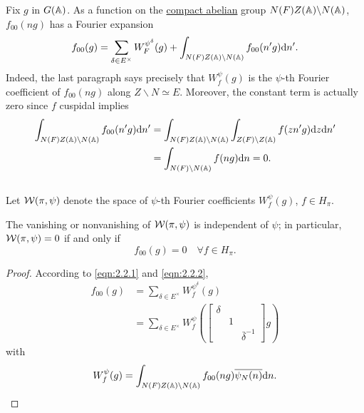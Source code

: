 Fix $g$ in $G(\mathbb{A})$.
As a function on the \underline{compact abelian} group $N(F) Z(\mathbb{A}) \backslash N(\mathbb{A})$, $f_{00}(ng)$ has a Fourier expansion
\begin{equation}
    \label{eqn:2.2.2}
    f_{00}(g) = \sum_{\delta \in E^\times} W_{F}^{\psi^\delta}(g) + \int_{N(F) Z(\mathbb{A}) \backslash N(\mathbb{A})} f_{00}(n'g) \mathrm{d} n'.
\end{equation}
Indeed, the last paragraph says precisely that $W_f^\psi(g)$ is the $\psi$-th Fourier coefficient of $f_{00}(ng)$ along $Z \backslash N \simeq E$. Moreover, the constant term is actually zero since $f$ cuspidal implies
\begin{align*}
    \int_{N(F)Z(\mathbb{A}) \backslash N(\mathbb{A})} f_{00}(n'g) \mathrm{d} n' &= \int_{N(F)Z(\mathbb{A}) \backslash N(\mathbb{A})} \int_{Z(F) \backslash Z(\mathbb{A})} f(zn'g) \mathrm{d} z \mathrm{d} n' \\
    &= \int_{N(F) \backslash N(\mathbb{A})} f(ng) \mathrm{d} n = 0.
\end{align*}


\subsection{}
\label{sec:2.3}

Let $\mathcal{W}(\pi, \psi)$ denote the space of $\psi$-th Fourier coefficients $W_f^\psi(g)$, $f \in H_\pi$.

\begin{proposition}
The vanishing or nonvanishing of $\mathcal{W}(\pi, \psi)$ is independent of $\psi$; in particular, $\mathcal{W}(\pi, \psi) = 0$ if and only if
\[
    f_{00}(g) = 0 \quad \forall f \in H_\pi.
\]
\end{proposition}
\begin{proof}
According to \eqref{eqn:2.2.1} and \eqref{eqn:2.2.2},
\begin{equation}
\begin{split}
\label{eqn:2.3.1}
    f_{00}(g) &= \sum_{\delta \in E^\times} W_{f}^{\psi^\delta}(g) \\
    &= \sum_{\delta \in E^\times} W_{f}^{\psi} \left(\begin{bmatrix}
        \delta & & \\ & 1 & \\ & & \bar{\delta}^{-1}
    \end{bmatrix} g\right)
\end{split}
\end{equation}
with
\[
    W_f^\psi(g) = \int_{N(F)Z(\mathbb{A}) \backslash N(\mathbb{A})} f_{00}(ng) \overline{\psi_N(n)} \mathrm{d} n.
\]
\end{proof}


